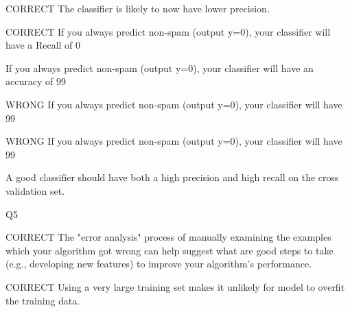 \documentclass[11pt]{article} %
\begin{document}
CORRECT The classifier is likely to now have lower precision.



CORRECT If you always predict non-spam (output y=0), your classifier will have a Recall of 0%

If you always predict non-spam (output y=0), your classifier will have an accuracy of 99%

WRONG If you always predict non-spam (output y=0), your classifier will have 99%

WRONG If you always predict non-spam (output y=0), your classifier will have 99%

 A good classifier should have both a high precision and high recall on the cross validation set.

Q5

CORRECT The "error analysis" process of manually examining the examples which your algorithm got wrong
can help suggest what are good steps to take (e.g., developing new features) to improve your algorithm's
performance.

CORRECT
Using a very large training set makes it unlikely for model to overfit the training data.
\end{document}
